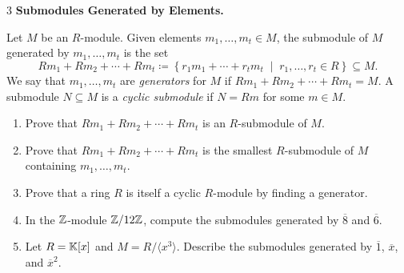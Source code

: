 \documentclass[Notebook.tex]{subfiles}
\begin{document}

    \begin{problem}{3}
        \textbf{Submodules Generated by Elements.} 
        
        Let $M$ be an $R$-module. Given elements $m_{1},\ldots,m_{t} \in M$, the submodule of $M$ generated by $m_{1},\ldots,m_{t}$ is the set
        \[
        Rm_{1}+Rm_{2}+\cdots+Rm_{t}\coloneqq \left\{r_1m_1+\cdots+r_tm_t \;\middle|\; r_1,\ldots,r_t \in R \right\} \subseteq M. 
        \]
        We say that $m_{1},\ldots,m_{t}$ are \emph{generators} for $M$ if $Rm_{1}+Rm_{2}+\cdots+Rm_{t}=M$.  A submodule $N \subseteq M$ is a \emph{cyclic submodule} if $N=Rm$ for some $m\in M$. 
            \begin{enumerate}
            \item Prove that $Rm_{1}+Rm_{2}+\cdots+Rm_{t}$ is an $R$-submodule of $M$.
            \item Prove that $Rm_{1}+Rm_{2}+\cdots+Rm_{t}$ is the smallest $R$-submodule of $M$ containing $m_{1},\ldots,m_{t}$. 
            \item Prove that a ring $R$ is itself a cyclic $R$-module by finding a generator. 
            \item In the $\mathbb Z$-module $\mathbb Z/12\mathbb Z$, compute the submodules generated by $\overline{8}$ and $\overline{6}$.
            \item Let $R=\mathbb K[x]$ and $M=R/\langle x^3 \rangle$. Describe the submodules generated by $\overline{1}$, $\overline{x}$, and $\overline{x}^2$. 
            \end{enumerate}
    \end{problem}
\end{document}

